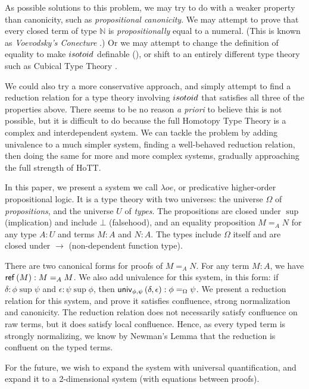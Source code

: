 As possible solutions to this problem, we may try to do with a weaker property than canonicity, such as \emph{propositional canonicity}.
We may attempt to prove that every closed term of type $\mathbb{N}$ is \emph{propositionally} equal to a numeral.  (This is known as
\emph{Voevodsky's Conecture} .)  Or we may attempt to change the definition of equality to make $isotoid$ definable (\cite{Polonsky14a}), or
shift to an entirely different type theory such as Cubical Type Theory .

We could also try a more conservative approach, and simply attempt to find a reduction relation for a type theory involving $isotoid$ that satisfies
all three of the properties above.  There seems to be no reason \emph{a priori} to believe this is not possible, but it is difficult to do because
the full Homotopy Type Theory is a complex and interdependent system.  We can tackle the problem by adding univalence to a much simpler system, finding
a well-behaved reduction relation, then doing the same for more and more complex systems, gradually approaching the full strength of HoTT.

In this paper, we present a system we call $\lambda o e$, or predicative higher-order propositional logic.  It is a type theory with two universes: the universe $\Omega$
of \emph{propositions}, and the universe $U$ of \emph{types}.  The propositions are closed under $\sup$ (implication) and include $\bot$ (falsehood), and an equality proposition $M =_A N$ for
any type $A : U$ and terms $M : A$ and $N : A$.  The types include $\Omega$ itself and are closed under $\rightarrow$ (non-dependent function type).

There are two canonical forms for proofs of $M =_A N$.  For any term $M : A$, we have $\mathsf{ref} \left( {M} \right) : M =_A M$.  We also add univalence for this system, in this form:
if $\delta : \phi \sup \psi$ and $\epsilon : \psi \sup \phi$, then $\mathsf{univ}_{{\phi} , {\psi}} \left( {\delta} , {\epsilon} \right) : \phi =_\Omega \psi$.  We present a reduction relation for this system, and prove it satisfies confluence, strong normalization and canonicity.   The reduction relation does not necessarily satisfy confluence on raw terms, but it does satisfy local confluence.  Hence, as
every typed term is strongly normalizing, we know by Newman's Lemma that the reduction is confluent on the typed terms.

For the future, we wish to expand the system with universal quantification, and expand it to a 2-dimensional system (with equations between proofs).

